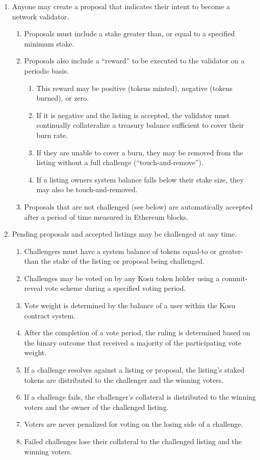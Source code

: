 \documentclass[10pt]{article}
\begin{document}
\begin{enumerate}
  \item Anyone may create a proposal that indicates their intent to become a network validator.
  \begin{enumerate}
    \item Proposals must include a stake greater than, or equal to a specified minimum stake.
    \item Proposals also include a ``reward'' to be executed to the validator on a periodic basis.
    \begin{enumerate}
      \item This reward may be positive (tokens minted), negative (tokens burned), or zero.
      \item If it is negative and the listing is accepted, the validator must continually collateralize a treasury balance sufficient to cover their burn rate.
      \item If they are unable to cover a burn, they may be removed from the listing without a full challenge (``touch-and-remove'').
      \item If a listing owners system balance falls below their stake size, they may also be touch-and-removed. 
    \end{enumerate}
    \item Proposals that are not challenged (see below) are automatically accepted after a period of time measured in Ethereum blocks.
  \end{enumerate}
  \item Pending proposals and accepted listings may be challenged at any time.
  \begin{enumerate}
    \item Challengers must have a system balance of tokens equal-to or greater-than the stake of the listing or proposal being challenged. 
    \item Challenges may be voted on by any Kosu token holder using a commit-reveal vote scheme during a specified voting period.
    \item Vote weight is determined by the balance of a user within the Kosu contract system.
    \item After the completion of a vote period, the ruling is determined based on the binary outcome that received a majority of the participating vote weight.
    \item If a challenge resolves against a listing or proposal, the listing's staked tokens are distributed to the challenger and the winning voters.
    \item If a challenge fails, the challenger's collateral is distributed to the winning voters and the owner of the challenged listing. 
    \item Voters are never penalized for voting on the losing side of a challenge.
    \item Failed challenges lose their collateral to the challenged listing and the winning voters.
  \end{enumerate}
\end{enumerate}
\end{document}
